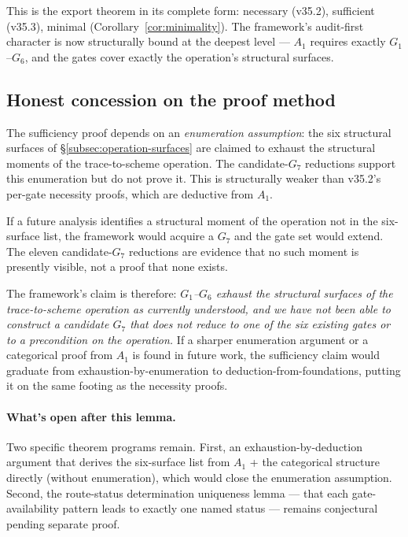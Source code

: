 This is the export theorem in its complete form: necessary (v35.2), sufficient (v35.3), minimal (Corollary~\ref{cor:minimality}). The framework's audit-first character is now structurally bound at the deepest level --- $A_1$ requires exactly $G_1$--$G_6$, and the gates cover exactly the operation's structural surfaces.

\subsection{Honest concession on the proof method}
\label{subsec:concession}

The sufficiency proof depends on an \emph{enumeration assumption}: the six structural surfaces of \S\ref{subsec:operation-surfaces} are claimed to exhaust the structural moments of the trace-to-scheme operation. The candidate-$G_7$ reductions support this enumeration but do not prove it. This is structurally weaker than v35.2's per-gate necessity proofs, which are deductive from $A_1$.

If a future analysis identifies a structural moment of the operation not in the six-surface list, the framework would acquire a $G_7$ and the gate set would extend. The eleven candidate-$G_7$ reductions are evidence that no such moment is presently visible, not a proof that none exists.

The framework's claim is therefore: \emph{$G_1$--$G_6$ exhaust the structural surfaces of the trace-to-scheme operation as currently understood, and we have not been able to construct a candidate $G_7$ that does not reduce to one of the six existing gates or to a precondition on the operation.} If a sharper enumeration argument or a categorical proof from $A_1$ is found in future work, the sufficiency claim would graduate from exhaustion-by-enumeration to deduction-from-foundations, putting it on the same footing as the necessity proofs.

\paragraph{What's open after this lemma.} Two specific theorem programs remain. First, an exhaustion-by-deduction argument that derives the six-surface list from $A_1$ + the categorical structure directly (without enumeration), which would close the enumeration assumption. Second, the route-status determination uniqueness lemma --- that each gate-availability pattern leads to exactly one named status --- remains conjectural pending separate proof.
